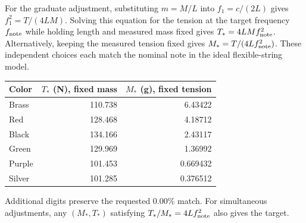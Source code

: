For the graduate adjustment, substituting $m=M/L$ into $f_1=c/(2L)$ gives $f_1^2=T/(4LM)$. Solving this equation for the tension at the target frequency $f_{\rm note}$ while holding length and measured mass fixed gives \(T_*=4LM f_{\rm note}^2\). Alternatively, keeping the measured tension fixed gives \(M_*=T/(4Lf_{\rm note}^2)\). These independent choices each match the nominal note in the ideal flexible-string model.
\begin{center}\begin{tabular}{lrr}\toprule
Color & \(T_*\) (N), fixed mass & \(M_*\) (g), fixed tension\\\midrule
Brass & 110.738 & 6.43422\\
Red & 128.468 & 4.18712\\
Black & 134.166 & 2.43117\\
Green & 129.969 & 1.36992\\
Purple & 101.453 & 0.669432\\
Silver & 101.285 & 0.376512\\\bottomrule\end{tabular}\end{center}
Additional digits preserve the requested 0.00\% match. For simultaneous adjustments, any \((M_*,T_*)\) satisfying \(T_*/M_*=4Lf_{\rm note}^2\) also gives the target.

